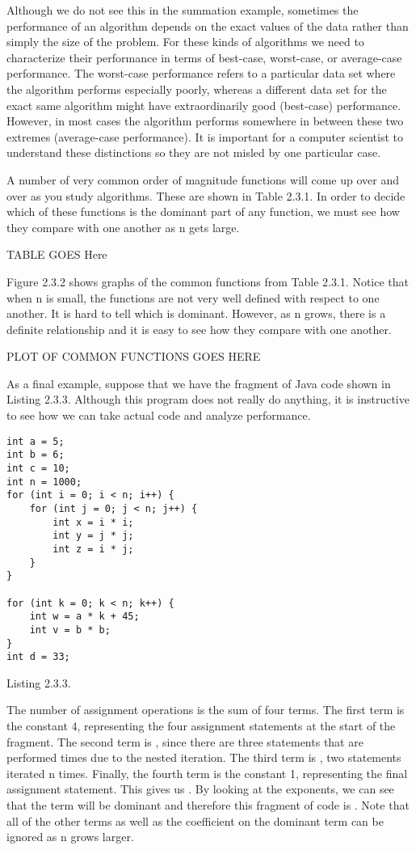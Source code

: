 Although we do not see this in the summation example, sometimes the performance of an algorithm depends on the exact values of the data rather than simply the size of the problem. For these kinds of algorithms we need to characterize their performance in terms of best-case, worst-case, or average-case performance. The worst-case performance refers to a particular data set where the algorithm performs especially poorly, whereas a different data set for the exact same algorithm might have extraordinarily good (best-case) performance. However, in most cases the algorithm performs somewhere in between these two extremes (average-case performance). It is important for a computer scientist to understand these distinctions so they are not misled by one particular case.


A number of very common order of magnitude functions will come up over and over as you study algorithms. These are shown in Table 2.3.1. In order to decide which of these functions is the dominant part of any
function, we must see how they compare with one another as n gets large.

TABLE GOES Here


Figure 2.3.2 shows graphs of the common functions from Table 2.3.1. Notice that when n is small, the functions are not very well defined with respect to one another. It is hard to tell which is dominant. However, as n grows, there is a definite relationship and it is easy to see how they compare with one another.

PLOT OF COMMON FUNCTIONS GOES HERE

As a final example, suppose that we have the fragment of Java code shown in Listing 2.3.3. Although this program does not really do anything, it is instructive to see how we can take actual code and analyze performance.
\begin{verbatim}
int a = 5;
int b = 6;
int c = 10;
int n = 1000;
for (int i = 0; i < n; i++) {
	for (int j = 0; j < n; j++) {
		int x = i * i;
		int y = j * j;
		int z = i * j;
	}
}

for (int k = 0; k < n; k++) {
	int w = a * k + 45;
	int v = b * b;
}
int d = 33;
\end{verbatim}
Listing 2.3.3.


The number of assignment operations is the sum of four terms. The first term is the constant 4, representing the four assignment statements at the start of the fragment. The second term is ,
since there are three statements that are performed times due to the nested iteration. The third term is , two statements iterated n times. Finally, the fourth term is the constant 1, representing the final assignment statement. This gives us . By looking at the exponents, we can see that the term will be dominant and therefore this fragment of code is . Note that all of the other terms as well as the coefficient on the dominant term can be ignored as n grows larger.


